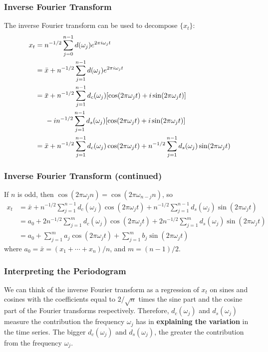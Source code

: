 \documentclass[%
xcolor=pdftex]{beamer}
\begin{document}
\begin{frame}
\frametitle{Inverse Fourier Transform}

The inverse Fourier transform can be used to decompose $\{x_t\}$:
\begin{align*}
x_t &= n^{-1/2} \sum_{j=0}^{n-1} d(\omega_j) e^{2 \pi i \omega_j t} \\
&= \bar{x} + n^{-1/2} \sum_{j=1}^{n-1} d(\omega_j) e^{2 \pi i \omega_j t}   \\
&= \bar{x} + n^{-1/2} \sum_{j=1}^{n-1} d_c(\omega_j)[ \cos(2 \pi  \omega_j t)+ i \sin(2 \pi  \omega_j t)] \\
&\hspace{5mm}  - i n^{-1/2} \sum_{j=1}^{n-1} d_s(\omega_j) [ \cos(2 \pi  \omega_j t)+ i \sin(2 \pi  \omega_j t)] \\
&= \bar{x} + n^{-1/2} \sum_{j=1}^{n-1} d_c(\omega_j) \cos(2 \pi  \omega_j t)  + n^{-1/2} \sum_{j=1}^{n-1} d_s(\omega_j) \sin(2 \pi  \omega_j t) 
\end{align*}

\end{frame}


\begin{frame}
\frametitle{Inverse Fourier Transform (continued)}

If $n$ is odd, then $\cos(2\pi \omega_j n) = \cos(2\pi \omega_{n-j} n)$, so 
\begin{align*}
x_t 
&= \bar{x} + n^{-1/2} \sum_{j=1}^{n-1} d_c(\omega_j) \cos(2 \pi  \omega_j t)  + n^{-1/2} \sum_{j=1}^{n-1} d_s(\omega_j) \sin(2 \pi  \omega_j t)  \\
&= a_0 + 2 n^{-1/2} \sum_{j=1}^{m} d_c(\omega_j)\cos(2 \pi  \omega_j t)  + 2n^{-1/2} \sum_{j=1}^{m} d_s(\omega_j) \sin(2 \pi  \omega_j t)  \\
&= a_0 +  \sum_{j=1}^{m} a_j \cos(2 \pi  \omega_j t)  + \sum_{j=1}^{m} b_j \sin(2 \pi  \omega_j t)  
\end{align*}
where $a_0=\bar{x}=(x_1+\cdots+x_n)/n$, and $m=(n-1)/2$.

\end{frame}



\begin{frame}
\frametitle{Interpreting the Periodogram}

We can think of the inverse Fourier transform as a
regression of $x_t$ on  sines and cosines with the coefficients
equal to $2/\sqrt{n}$ times the sine part and the cosine part
of the Fourier transforms respectively. Therefore,
$d_c(\omega_j)$ and $d_s(\omega_j)$ measure the contribution the frequency $\omega_j$ has in \textbf{explaining the variation} in
the time series. The bigger $d_c(\omega_j)$ and
$d_s(\omega_j)$, the greater the contribution from the
frequency $\omega_j$.

\end{frame}
\end{document}
